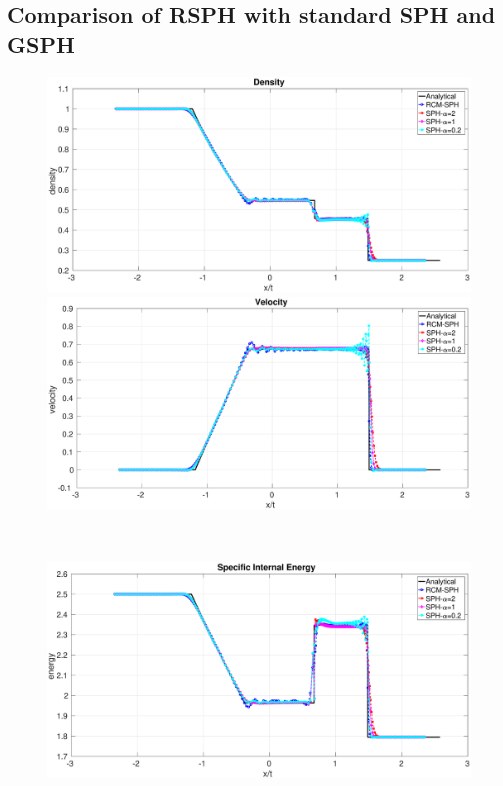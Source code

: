 \documentclass[review]{elsarticle}
\begin{document}
\subsection{Comparison of RSPH with standard SPH and GSPH}
\begin{figure}[htp]
    \centering
    \begin{minipage}{.495\textwidth}
        \centering
        \includegraphics[width=0.99 \textwidth]{./Figures/Sod/RCM-Sod-SPH-alf-rho}
    \end{minipage}%
    \begin{minipage}{.495 \textwidth}
        \centering
        \includegraphics[width=0.99 \textwidth]{./Figures/Sod/RCM-Sod-SPH-alf-v}
    \end{minipage}%
    \\
    \begin{minipage}{.495\textwidth}
        \centering
        \includegraphics[width=0.99 \textwidth]{./Figures/Sod/RCM-Sod-SPH-alf-e}

\end{minipage}
\end{figure}
\end{document}
